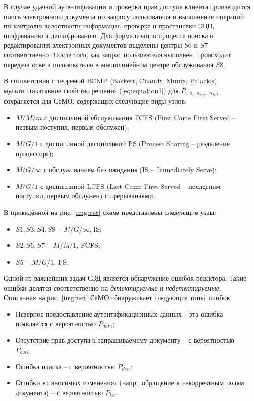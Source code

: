\vspace{\baselineskip}
В случае удачной аутентификации и проверки прав доступа клиента производится поиск электронного документа по запросу пользователя и выполнение операций по контролю целостности информации, проверке и простановки ЭЦП, шифрованию и дешифрованию. Для формализации процесса поиска и редактирования электронных документов выделены центры $S6$ и $S7$ соответственно.
После того, как запрос пользователя выполнен, происходит передача ответа пользователю в многолинейном центре обслуживания $S8$.

\vspace{\baselineskip}
В соответствии с теоремой BCMP (Baskett, Chandy, Muntz, Palacios) мультипликативное свойство решения (\ref{eq:equation1}) для $P_(n_1,n_2,\ldots,n_R)$ сохраняется для СеМО, содержащих следующие виды узлов:
\begin{itemize}
  \item $M/M/m$ с дисциплиной обслуживания FCFS (First Came First Served -- первым поступил, первым обслужен);
  \item $M/G/1$ с дисциплиной дисциплиной PS (Process Sharing -- разделение процессора);
  \item $M/G/\infty$ с обслуживанием без ожидания (IS -- Immediately Serve);
  \item $M/G/1$ с дисциплиной LCFS (Last Came First Served -- последним поступил, первым обслужен) с прерываниями.\cite{bib7}
\end{itemize}

В приведённой на рис. \ref{img:net} схеме представлены следующие узлы:
\begin{itemize}
  \item $S1, S3, S4, S8 - M/G/\infty$, IS;
  \item $S2, S6, S7 - M/M/1$, FCFS;
  \item $S5 - M/G/1$, PS.\cite{bib3}
\end{itemize}

Одной из важнейших задач СЭД является обнаружение ошибок редактора. Такие ошибки делятся соответственно на \textit{детектируемые} и \textit{недетектируемые}.
Описанная на рис. \ref{img:net} СеМО обнаруживает следующие типы ошибок:
\begin{itemize}
  \item Неверное предоставление аутентификационных данных -- эта ошибка появляется с вероятностью $P_{data}$;
  \item Отсутствие прав доступа к запрашиваемому документу -- с вероятностью $P_{auth}$;
  \item Ошибка поиска -- с вероятностью $P_{den}$;
  \item Ошибки во вносимых изменениях (напр., обращение к некорректным полям документа) -- с вероятностью $P_{txt}$.
\end{itemize}

